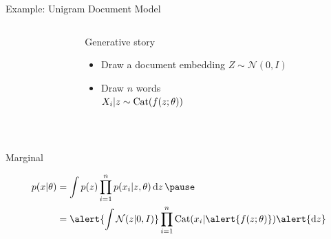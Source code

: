 \begin{frame}{Example: Unigram Document Model}


\begin{columns}
	\begin{column}{0.2\textwidth}
    \end{column}
    \begin{column}{0.75\textwidth}
    	Generative story 
    	\begin{itemize}
			\item Draw a document embedding $Z \sim \mathcal N(0, I)$
			\item Draw $n$ words\\
			$X_i|z \sim \operatorname{Cat}(f(z; \theta))$
		\end{itemize}
    \end{column}
    \end{columns}
    
    
    ~
    
	Marginal \pause
	\begin{small}
    \begin{equation*}
	\begin{aligned}						
		p(x|\theta) &= \int p(z) \prod_{i=1}^n p(x_i|z, \theta) \dd{z} \pause \\
		&= \alert{\int \mathcal N(z|0, I)} \prod_{i=1}^n \Cat(x_i|\alert{f(z; \theta)}) \alert{\dd{z}}
	\end{aligned}
	\end{equation*}
	\end{small}

\end{frame}

